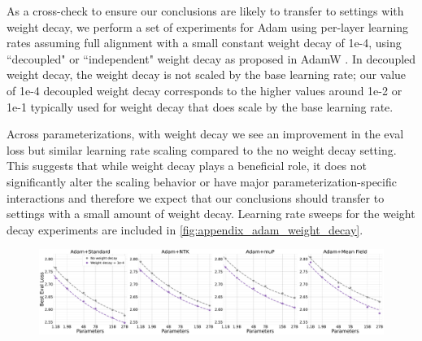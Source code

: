 \documentclass{article}
\theoremstyle{plain}
\theoremstyle{definition}
\theoremstyle{remark}
\begin{document}
As a cross-check to ensure our conclusions are likely to transfer to settings with weight decay, we perform a set of experiments for Adam using per-layer learning rates assuming full alignment with a small constant weight decay of 1e-4, using ``decoupled" or ``independent" weight decay as proposed in AdamW \citep{loshchilov2018decoupled}. In decoupled weight decay, the weight decay is not scaled by the base learning rate; our value of 1e-4 decoupled weight decay corresponds to the higher values around 1e-2 or 1e-1 typically used for weight decay that does scale by the base learning rate.

Across parameterizations, with weight decay we see an improvement in the eval loss but similar learning rate scaling compared to the no weight decay setting. This suggests that while weight decay plays a beneficial role, it does not significantly alter the scaling behavior or have major parameterization-specific interactions and therefore we expect that our conclusions should transfer to settings with a small amount of weight decay. Learning rate sweeps for the weight decay experiments are included in  \cref{fig:appendix_adam_weight_decay}.

\vspace{48pt}

\begin{figure}[ht]
    \begin{center}
        \includegraphics[width=\linewidth, trim={0, 0, 0, 0},clip]{icml2024/figures/wd_appendix/wd_per_module_lr_scaling_plot.pdf}
       
        \caption{}
        \label{fig:wd_lr_sweeps}
    \end{center}
\end{figure}

\vfill
\end{document}

